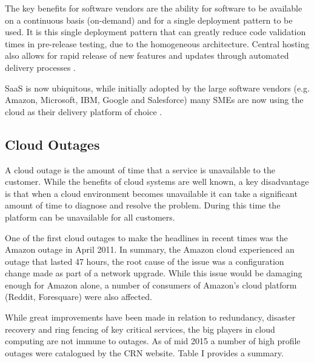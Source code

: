 \documentclass[conference]{IEEEtran}
\begin{document}
The key benefits for software vendors are the ability for software to be available on a continuous basis (on-demand) and for a single deployment pattern to be used. It is this single deployment pattern that can greatly reduce code validation times in pre-release testing, due to the homogeneous architecture. Central hosting also allows for rapid release of new features and updates through automated delivery processes \cite{datacentre2015}. \par

SaaS is now ubiquitous, while initially adopted by the large software vendors (e.g. Amazon, Microsoft, IBM, Google and Salesforce) many SMEs are now using the cloud as their delivery platform of choice \cite{CRN2015providers}. \par

\subsection{Cloud Outages}
A cloud outage is the amount of time that a service is unavailable to the customer. While the benefits of cloud systems are well known, a key disadvantage is that when a cloud environment becomes unavailable it can take a significant amount of time to diagnose and resolve the problem. During this time the platform can be unavailable for all customers. \par

One of the first cloud outages to make the headlines in recent times was the Amazon outage in April 2011. In summary, the Amazon cloud experienced an outage that lasted 47 hours, the root cause of the issue was a configuration change made as part of a network upgrade. While this issue would be damaging enough for Amazon alone, a number of consumers of Amazon's cloud platform (Reddit, Foresquare) were also affected. \cite{InfoWorld2015outage} \par

While great improvements have been made in relation to redundancy, disaster recovery and ring fencing of key critical services, the big players in cloud computing are not immune to outages. As of mid 2015 a number of high profile outages were catalogued by the CRN website. \cite{CRN2015outage} Table I provides a summary. \par
\end{document}

